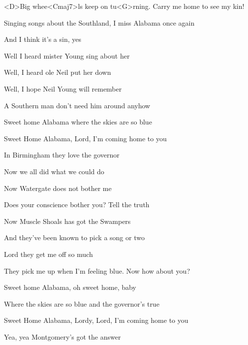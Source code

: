 

\zs
<D>Big whee<Cmaj7>ls keep on tu<G>rning.
Carry me home to see my kin!

Singing songs about the Southland,
I miss Alabama once again

And I think it's a sin, yes
\ks

\zs
Well I heard mister Young sing about her

Well, I heard ole Neil put her down

Well, I hope Neil Young will remember

A Southern man don't need him around anyhow
\ks

\zr
Sweet home Alabama
where the skies are so blue

Sweet Home Alabama,
Lord, I'm coming home to you
\kr

\zs
In Birmingham they love the governor

Now we all did what we could do

Now Watergate does not bother me

Does your conscience bother you?
Tell the truth
\ks

\zr \kr

\zs
Now Muscle Shoals has got the Swampers

And they've been known to pick a song or two

Lord they get me off so much

They pick me up when I'm feeling blue.
Now how about you?
\ks

\zr \kr

\zr
Sweet home Alabama,
oh sweet home, baby

Where the skies are so blue
and the governor's true
\kr

\zr
Sweet Home Alabama, Lordy, Lord, I'm coming home to you

Yea, yea Montgomery's got the answer
\kr

\kp
